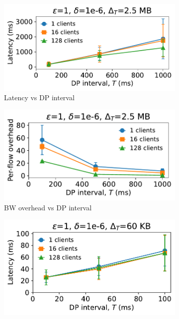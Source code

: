\begin{figure}[t]
  \centering
  \begin{subfigure}[b]{0.49\columnwidth}
      \centering
      \includegraphics[width=\textwidth]{latency_vs_dp_interval_video_updated.pdf}
      \caption{Latency vs DP interval}
      \label{fig:video-lat-vs-dpInt}
  \end{subfigure}
  \hfill
  \begin{subfigure}[b]{0.49\columnwidth}
      \centering
      \includegraphics[width=\textwidth]{overhead_vs_dp_interval_video_updated.pdf}
      \caption{BW overhead vs DP interval}
      \label{fig:video-overhead-vs-dpInt}
  \end{subfigure}
  \begin{subfigure}[b]{0.49\columnwidth}
      \centering
      \includegraphics[width=\textwidth]{latency_vs_dp_interval_web_updated.pdf}

\end{subfigure}
\end{figure}
